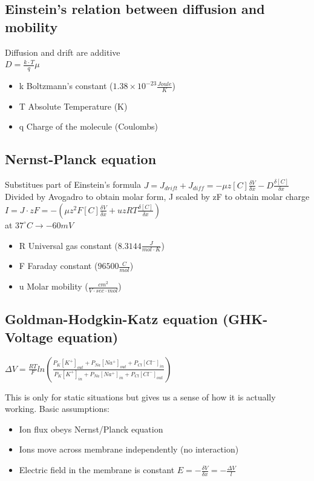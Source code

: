 \documentclass[english,11pt]{article}
\begin{document}
\subsection{Einstein's relation between diffusion and mobility}
Diffusion and drift are additive\\
$D = \frac{k \cdot T}{q} \mu$

\begin{itemize}
\item k Boltzmann's constant ($1.38 \times 10^{-23} \frac{Joule}{K}$)
\item T Absolute Temperature (K)
\item q Charge of the molecule (Coulombs)
\end{itemize}

\subsection{Nernst-Planck equation}
Substitues part of Einstein's formula
$J = J_{drift} + J_{diff} = -\mu z [C] \frac{\delta V}{\delta x} -D \frac{\delta[C]}{\delta x}$\\

Divided by Avogadro to obtain molar form, J scaled by zF to obtain molar charge\\

$I = J \cdot zF = -(\mu z^2 F [C] \frac{\delta V}{\delta x} +uzRT \frac{\delta[C]}{\delta x})$\\

at $37^\circ C \rightarrow -60 mV$

\begin{itemize}
\item R Universal gas constant ($8.3144 \frac{J}{mol \cdot K}$)
\item F Faraday constant ($ 96500 \frac{C}{mol}$)
\item u Molar mobility ($\frac{cm^2}{V \cdot sec \cdot mol}$)
\end{itemize}

\subsection{Goldman-Hodgkin-Katz equation (GHK-Voltage equation)}

$\Delta V = \frac{RT}{F} ln(\frac{P_K[K^+]_{out} + P_{Na}[Na^+]_{out} + P_{Cl}[Cl^{-}]_{in}}{P_K[K^+]_{in} + P_{Na}[Na^+]_{in} + P_{Cl}[Cl^{-}]_{out}})$

This is only for static situations but gives us a sense of how it is actually working.
Basic assumptions:
\begin{itemize}
\item Ion flux obeys Nernst/Planck equation
\item Ions move across membrane independently (no interaction)
\item Electric field in the membrane is constant $E = -\frac{\delta V}{\delta x} = - \frac{\Delta V}{l}$
\end{itemize}
\end{document}
